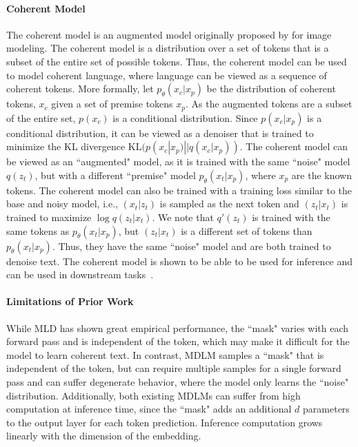 \paragraph{Coherent Model}
The coherent model is an augmented model originally proposed by \citet{austin2023structured} for image modeling. The coherent model is a distribution over a set of tokens that is a subset of the entire set of possible tokens. Thus, the coherent model can be used to model coherent language, where language can be viewed as a sequence of coherent tokens. More formally, let $p_\theta(x_c|x_p)$ be the distribution of coherent tokens, $x_c$ given a set of premise tokens $x_p$. As the augmented tokens are a subset of the entire set, $p(x_c)$ is a conditional distribution. Since $p(x_c|x_p)$ is a conditional distribution, it can be viewed as a denoiser that is trained to minimize the KL divergence $\mathrm{KL}(p(x_c|x_p) || q(x_c|x_p))$. The coherent model can be viewed as an ``augmented" model, as it is trained with the same ``noise" model $q(z_t)$, but with a different ``premise" model $p_\theta(x_t|x_p)$, where $x_p$ are the known tokens. The coherent model can also be trained with a training loss similar to the base and noisy model, i.e., $(x_t|z_t)$ is sampled as the next token and $(z_t|x_t)$ is trained to maximize $\log q(z_t|x_t)$. We note that $q'(z_t)$ is trained with the same tokens as $p_\theta(x_t|x_p)$, but $(z_t|x_t)$ is a different set of tokens than $p_\theta(x_t|x_p)$. Thus, they have the same ``noise" model and are both trained to denoise text. The coherent model is shown to be able to be used for inference and can be used in downstream tasks~\citep{austin2023structured,coja2020replica}.

\paragraph{Limitations of Prior Work}
While MLD has shown great empirical performance, the ``mask" varies with each forward pass and is independent of the token, which may make it difficult for the model to learn coherent text. In contrast, MDLM samples a ``mask" that is independent of the token, but can require multiple samples for a single forward pass and can suffer degenerate behavior, where the model only learns the ``noise" distribution. Additionally, both existing MDLMs can suffer from high computation at inference time, since the ``mask" adds an additional $d$ parameters to the output layer for each token prediction. Inference computation grows linearly with the dimension of the embedding. 


